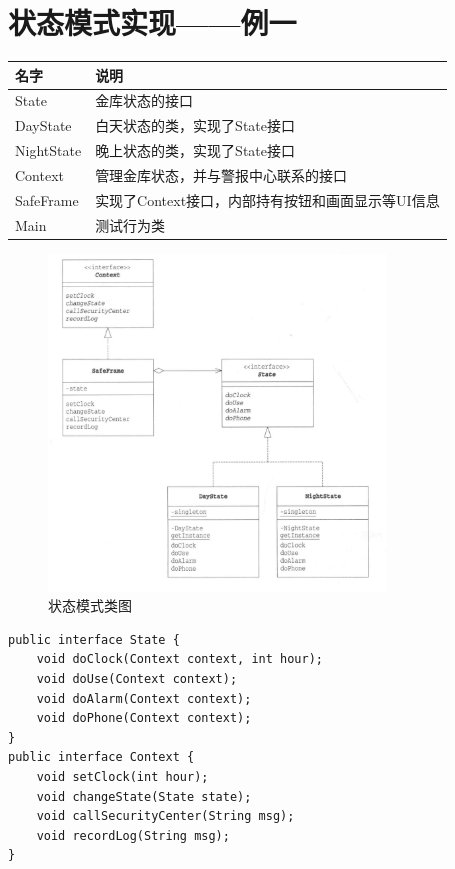 \section{状态模式实现——例一}
\begin{table}[!h]
	\begin{tabular}{|l|l|}
		\hline
		名字&说明\\
		\hline
		State&金库状态的接口\\
		\hline
		DayState&白天状态的类，实现了State接口\\
		\hline
		NightState&晚上状态的类，实现了State接口\\
		\hline
		Context&管理金库状态，并与警报中心联系的接口\\
		\hline
		SafeFrame&实现了Context接口，内部持有按钮和画面显示等UI信息\\
		\hline
		Main&测试行为类\\
		\hline
	\end{tabular}
\end{table}
\begin{figure}[!h]
	\centering
	\includegraphics[width=0.8\textwidth]{image/19-1}
	\caption{状态模式类图}
\end{figure}
\begin{lstlisting}
public interface State {
	void doClock(Context context, int hour);
	void doUse(Context context);
	void doAlarm(Context context);
	void doPhone(Context context);
}
public interface Context {
	void setClock(int hour);
	void changeState(State state);
	void callSecurityCenter(String msg);
	void recordLog(String msg);
}
\end{lstlisting}
